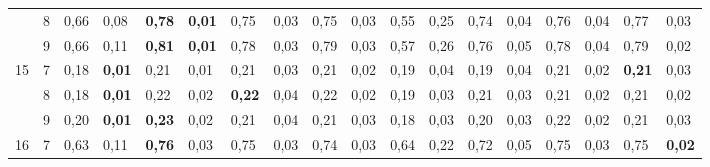 \documentclass[conference]{IEEEtran}
\begin{document}
\begin{table}[]
\begin{tabular}{|cl|ll|ll|ll|ll|ll|ll|ll|ll|}
		\multicolumn{1}{|c|}{}                    & 8 & \multicolumn{1}{l|}{0,66} & 0,08          & \multicolumn{1}{l|}{\textbf{0,78}} & \textbf{0,01} & \multicolumn{1}{l|}{0,75}          & 0,03 & \multicolumn{1}{l|}{0,75}          & 0,03 & \multicolumn{1}{l|}{0,55}                 & 0,25 & \multicolumn{1}{l|}{0,74} & 0,04 & \multicolumn{1}{l|}{0,76}          & 0,04          & \multicolumn{1}{l|}{0,77}          & 0,03          \\ \cline{2-18} 
		\multicolumn{1}{|c|}{}                    & 9 & \multicolumn{1}{l|}{0,66} & 0,11          & \multicolumn{1}{l|}{\textbf{0,81}} & \textbf{0,01} & \multicolumn{1}{l|}{0,78}          & 0,03 & \multicolumn{1}{l|}{0,79}          & 0,03 & \multicolumn{1}{l|}{0,57}                 & 0,26 & \multicolumn{1}{l|}{0,76} & 0,05 & \multicolumn{1}{l|}{0,78}          & 0,04          & \multicolumn{1}{l|}{0,79}          & 0,02          \\ \hline
		\multicolumn{1}{|c|}{\multirow{3}{*}{15}} & 7 & \multicolumn{1}{l|}{0,18} & \textbf{0,01} & \multicolumn{1}{l|}{0,21}          & 0,01          & \multicolumn{1}{l|}{0,21}          & 0,03 & \multicolumn{1}{l|}{0,21}          & 0,02 & \multicolumn{1}{l|}{0,19}                 & 0,04 & \multicolumn{1}{l|}{0,19} & 0,04 & \multicolumn{1}{l|}{0,21}          & 0,02          & \multicolumn{1}{l|}{\textbf{0,21}} & 0,03          \\ \cline{2-18} 
		\multicolumn{1}{|c|}{}                    & 8 & \multicolumn{1}{l|}{0,18} & \textbf{0,01} & \multicolumn{1}{l|}{0,22}          & 0,02          & \multicolumn{1}{l|}{\textbf{0,22}} & 0,04 & \multicolumn{1}{l|}{0,22}          & 0,02 & \multicolumn{1}{l|}{0,19}                 & 0,03 & \multicolumn{1}{l|}{0,21} & 0,03 & \multicolumn{1}{l|}{0,21}          & 0,02          & \multicolumn{1}{l|}{0,21}          & 0,02          \\ \cline{2-18} 
		\multicolumn{1}{|c|}{}                    & 9 & \multicolumn{1}{l|}{0,20} & \textbf{0,01} & \multicolumn{1}{l|}{\textbf{0,23}} & 0,02          & \multicolumn{1}{l|}{0,21}          & 0,04 & \multicolumn{1}{l|}{0,21}          & 0,03 & \multicolumn{1}{l|}{0,18}                 & 0,03 & \multicolumn{1}{l|}{0,20} & 0,03 & \multicolumn{1}{l|}{0,22}          & 0,02          & \multicolumn{1}{l|}{0,21}          & 0,03          \\ \hline
		\multicolumn{1}{|c|}{\multirow{3}{*}{16}} & 7 & \multicolumn{1}{l|}{0,63} & 0,11          & \multicolumn{1}{l|}{\textbf{0,76}} & 0,03          & \multicolumn{1}{l|}{0,75}          & 0,03 & \multicolumn{1}{l|}{0,74}          & 0,03 & \multicolumn{1}{l|}{0,64}                 & 0,22 & \multicolumn{1}{l|}{0,72} & 0,05 & \multicolumn{1}{l|}{0,75}          & 0,03          & \multicolumn{1}{l|}{0,75}          & \textbf{0,02} \\ \cline{2-18} 

\end{tabular}
\end{table}
\end{document}
